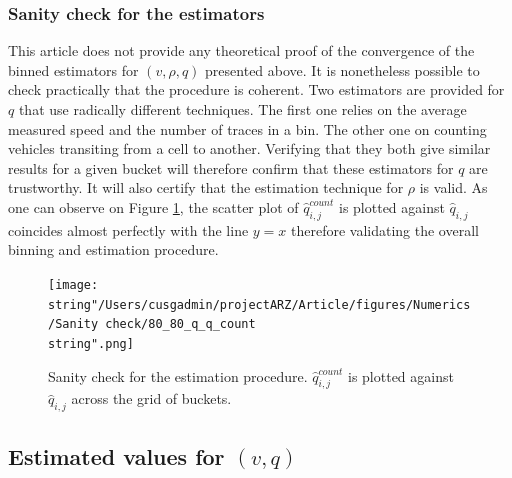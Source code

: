 \documentclass[preprint]{elsarticle}
\begin{document}
\subsubsection{Sanity check for the estimators}

This article does not provide any theoretical proof of the convergence
of the binned estimators for $\left(v,\rho,q\right)$ presented above.
It is nonetheless possible to check practically that the procedure
is coherent. Two estimators are provided for $q$ that use radically
different techniques. The first one relies on the average measured
speed and the number of traces in a bin. The other one on counting
vehicles transiting from a cell to another. Verifying that they both
give similar results for a given bucket will therefore confirm that
these estimators for $q$ are trustworthy. It will also certify that
the estimation technique for $\rho$ is valid. As one can observe
on Figure \ref{fig:Sanity-check}, the scatter plot of $\widehat{q}_{i,j}^{count}$
is plotted against $\widehat{q}_{i,j}$ coincides almost perfectly
with the line $y=x$ therefore validating the overall binning and
estimation procedure.

\begin{figure}
\begin{centering}
\texttt{[image: \\string"/Users/cusgadmin/projectARZ/Article/figures/Numerics/Sanity check/80\_80\_q\_q\_count\\string".png]}
\par\end{centering}

\protect\caption{Sanity check for the estimation procedure. $\widehat{q}_{i,j}^{count}$
is plotted against $\widehat{q}_{i,j}$ across the grid of buckets.
\label{fig:Sanity-check}}
\end{figure}



\subsection{Estimated values for $\left(v,q\right)$}
\end{document}

